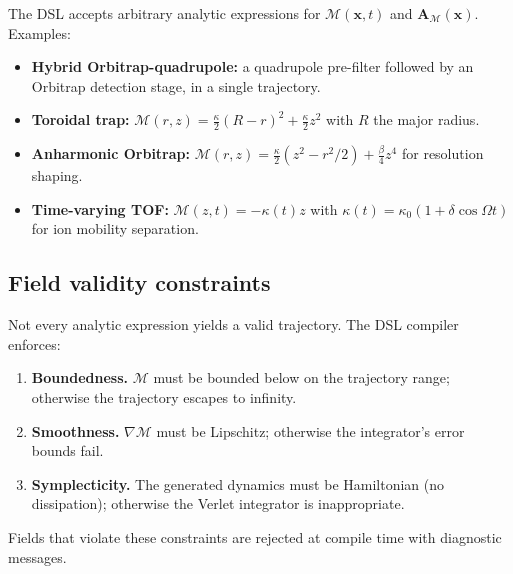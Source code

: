 \documentclass[twocolumn,11pt,a4paper]{article}
\theoremstyle{definition}
\theoremstyle{remark}
\newcommand{\Depth}{\mathcal{M}}
\newcommand{\Apartition}{\mathbf{A}_{\mathcal{M}}}
\begin{document}
The DSL accepts arbitrary analytic expressions for $\Depth(\mathbf{x},t)$ and $\Apartition(\mathbf{x})$. Examples:

\begin{itemize}[nosep]
    \item \textbf{Hybrid Orbitrap-quadrupole:} a quadrupole pre-filter followed by an Orbitrap detection stage, in a single trajectory.
    \item \textbf{Toroidal trap:} $\Depth(r,z) = \tfrac{\kappa}{2}(R - r)^2 + \tfrac{\kappa}{2}z^2$ with $R$ the major radius.
    \item \textbf{Anharmonic Orbitrap:} $\Depth(r,z) = \tfrac{\kappa}{2}(z^2 - r^2/2) + \tfrac{\beta}{4}z^4$ for resolution shaping.
    \item \textbf{Time-varying TOF:} $\Depth(z,t) = -\kappa(t) z$ with $\kappa(t) = \kappa_0(1 + \delta\cos\Omega t)$ for ion mobility separation.
\end{itemize}

\subsection{Field validity constraints}

Not every analytic expression yields a valid trajectory. The DSL compiler enforces:

\begin{enumerate}[nosep]
    \item \textbf{Boundedness.} $\Depth$ must be bounded below on the trajectory range; otherwise the trajectory escapes to infinity.
    \item \textbf{Smoothness.} $\nabla\Depth$ must be Lipschitz; otherwise the integrator's error bounds fail.
    \item \textbf{Symplecticity.} The generated dynamics must be Hamiltonian (no dissipation); otherwise the Verlet integrator is inappropriate.
\end{enumerate}

Fields that violate these constraints are rejected at compile time with diagnostic messages.
\end{document}
